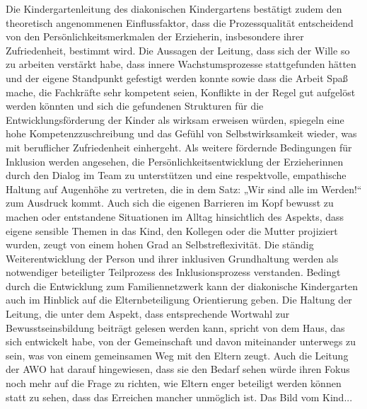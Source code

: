 Die Kindergartenleitung des diakonischen Kindergartens bestätigt zudem den theoretisch angenommenen Einflussfaktor, dass die Prozessqualität entscheidend von den Persönlichkeitsmerkmalen der Erzieherin, insbesondere ihrer Zufriedenheit, bestimmt wird. Die Aussagen der Leitung, dass sich der Wille so zu arbeiten verstärkt habe, dass innere Wachstumsprozesse stattgefunden hätten und der eigene Standpunkt gefestigt werden konnte sowie dass die Arbeit Spaß mache, die Fachkräfte sehr kompetent seien, Konflikte in der Regel gut aufgelöst werden könnten und sich die gefundenen Strukturen für die Entwicklungsförderung der Kinder als wirksam erweisen würden, spiegeln eine hohe Kompetenzzuschreibung und das Gefühl von Selbstwirksamkeit wieder, was mit beruflicher Zufriedenheit einhergeht.
Als weitere fördernde Bedingungen für Inklusion werden angesehen, die Persönlichkeitsentwicklung der Erzieherinnen durch den Dialog im Team zu unterstützen und eine respektvolle, empathische Haltung auf Augenhöhe zu vertreten, die in dem Satz: „Wir sind alle im Werden!“ zum Ausdruck kommt. Auch sich die eigenen Barrieren im Kopf bewusst zu machen oder entstandene Situationen im Alltag hinsichtlich des Aspekts, dass eigene sensible Themen in das Kind, den Kollegen oder die Mutter projiziert wurden, zeugt von einem hohen Grad an Selbstreflexivität. 
Die ständig Weiterentwicklung der Person und ihrer inklusiven Grundhaltung werden als notwendiger beteiligter Teilprozess des Inklusionsprozess verstanden.
Bedingt durch die Entwicklung zum Familiennetzwerk kann der diakonische Kindergarten auch im Hinblick auf die Elternbeteiligung Orientierung geben. Die Haltung der Leitung, die unter dem Aspekt, dass entsprechende Wortwahl zur Bewusstseinsbildung beiträgt gelesen werden kann, spricht von dem Haus, das sich entwickelt habe, von der Gemeinschaft und davon miteinander unterwegs zu sein, was von einem gemeinsamen Weg mit den Eltern zeugt. Auch die Leitung der AWO hat darauf hingewiesen, dass sie den Bedarf sehen würde ihren Fokus noch mehr auf die Frage zu richten, wie Eltern enger beteiligt werden können statt zu sehen, dass das Erreichen mancher unmöglich ist. Das Bild vom Kind...     
 
